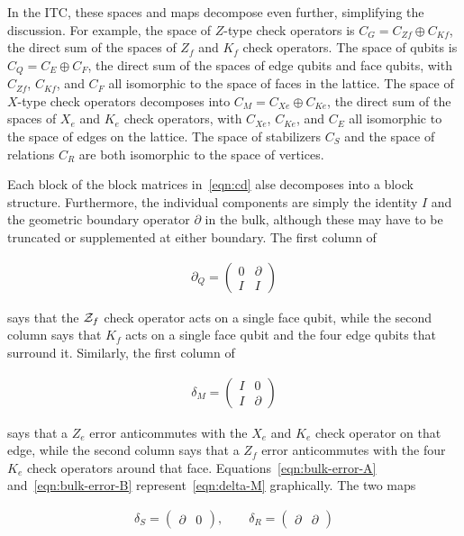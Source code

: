 In the ITC, these spaces and maps decompose even further, simplifying the discussion. For example, the space of $Z$-type check operators is $C_G=C_{Zf}\oplus C_{Kf}$, the direct sum of the spaces of $Z_f$ and $K_f$ check operators. The space of qubits is $C_Q=C_E \oplus C_F$, the direct sum of the spaces of edge qubits and face qubits, with $C_{Zf}$, $C_{Kf}$, and $C_F$ all isomorphic to the space of faces in the lattice. The space of $X$-type check operators decomposes into $C_M = C_{Xe} \oplus C_{Ke}$, the direct sum of the spaces of $X_e$ and $K_e$ check operators, with  $C_{Xe}$, $C_{Ke}$, and $C_E$ all isomorphic to the space of edges on the lattice. The space of stabilizers $C_S$ and the space of relations $C_R$ are both isomorphic to the space of vertices.

Each block of the block matrices in~\eqref{eqn:cd} alse decomposes into a block structure. Furthermore, the individual components are simply the identity $I$ and the geometric boundary operator $\partial$ in the bulk, although these may have to be truncated or supplemented at either boundary. The first column of
\begin{singlespace}
\begin{align}
\partial_Q = \left( \begin{array}{c|c} 0 & \partial \\\hline I & I
\end{array} \right)
\end{align}
\end{singlespace}
says that the $\mathcal{Z}_f$ check operator acts on a single face qubit, while the second column says that $K_f$ acts on a single face qubit and the four edge qubits that surround it. Similarly, the first column of
\begin{singlespace}
\begin{align}
\delta_M = \left( \begin{array}{c|c} I & 0 \\\hline I & \partial \label{eqn:delta-M}
\end{array} \right)
\end{align}
\end{singlespace}
says that a $Z_e$ error anticommutes with the $X_e$ and $K_e$ check operator on that edge, while the second column says that a $Z_f$ error anticommutes with the four $K_e$ check operators around that face. Equations~\eqref{eqn:bulk-error-A} and~\eqref{eqn:bulk-error-B} represent~\eqref{eqn:delta-M} graphically.
The two maps 
\begin{singlespace}
\begin{align}
\delta_S = \left( \begin{array}{c|c} \partial & 0
\end{array} \right), \qquad \delta_R = \left( \begin{array}{c|c} \partial & \partial
\end{array} \right)
\end{align}
\end{singlespace}
